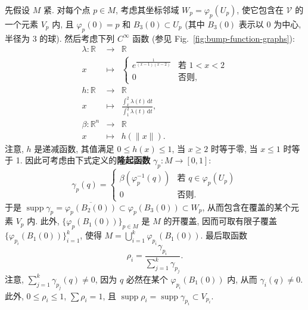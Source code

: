 \begin{enumerate}[label=(\arabic*),leftmargin=*]
{\begin{RiemannProof}
先假设 $M$ 紧. 对每个点 $p\in M$, 考虑其坐标邻域 $W_p=\varphi_p(U_p)$, 使它包含在 $\mathcal{V}$ 的一个元素 $V_p$ 内, 且 $\varphi_p(0)=p$ 和 $B_3(0)\subset U_p$ (其中 $B_3(0)$ 表示以 0 为中心, 半径为 3 的球). 然后考虑下列 $C^\infty$ 函数 (参见 Fig.~\ref{fig:bump-function-graphs}):
\[
  \begin{array}{rcl}
    \lambda:\mathbb{R}&\to&\mathbb{R}\\
    x&\mapsto&
    \begin{cases}
      e^{\frac{1}{(x-1)(x-2)}}&\text{若 }1<x<2\\
      0&\text{否则},
    \end{cases}\\[.7ex]
    h:\mathbb{R}&\to&\mathbb{R}\\
    x&\mapsto&\displaystyle\frac{\int_x^2\lambda(t)\,\mathrm{d}t}
      {\int_1^2\lambda(t)\,\mathrm{d}t},\\[1ex]
    \beta:\mathbb{R}^n&\to&\mathbb{R}\\
    x&\mapsto&h(\lVert x\rVert).
  \end{array}
\]
注意, $h$ 是递减函数, 其值满足 $0\leq h(x)\leq1$, 当 $x\geq2$ 时等于零, 当 $x\leq1$ 时等于 1. 因此可考虑由下式定义的\label{idx:bump-function-definition}\textbf{隆起函数} $\gamma_p:M\to[0,1]$:
\[
  \gamma_p(q)=
  \begin{cases}
    \beta(\varphi_p^{-1}(q))&\text{若 }q\in\varphi_p(U_p)\\
    0&\text{否则}.
  \end{cases}
\]
于是 $\operatorname{supp}\gamma_p=\overline{\varphi_p(B_2(0))}\subset\varphi_p(B_3(0))\subset W_p$, 从而包含在覆盖的某个元素 $V_p$ 内. 此外, $\{\varphi_p(B_1(0))\}_{p\in M}$ 是 $M$ 的开覆盖, 因而可取有限子覆盖 $\{\varphi_{p_i}(B_1(0))\}_{i=1}^k$, 使得 $M=\bigcup_{i=1}^k\varphi_{p_i}(B_1(0))$. 最后取函数
\[
  \rho_i=\frac{\gamma_{p_i}}{\sum_{j=1}^k\gamma_{p_j}}.
\]
注意, $\sum_{j=1}^k\gamma_{p_j}(q)\ne0$, 因为 $q$ 必然在某个 $\varphi_{p_i}(B_1(0))$ 内, 从而 $\gamma_i(q)\ne0$. 此外, $0\leq\rho_i\leq1$, $\sum\rho_i=1$, 且 $\operatorname{supp}\rho_i=\operatorname{supp}\gamma_{p_i}\subset V_{p_i}$.


\end{RiemannProof}}
\end{enumerate}
